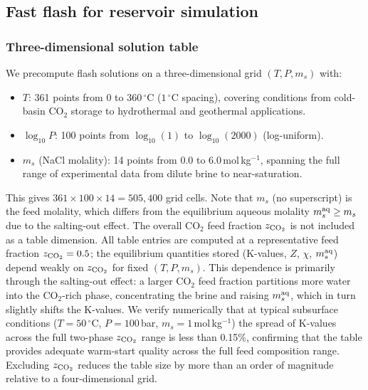 \documentclass[preprint,12pt,number]{elsarticle}
\begin{document}
\subsection{Fast flash for reservoir simulation}
\label{sec:fast_flash}

\subsubsection{Three-dimensional solution table}
\label{sec:table}

We precompute flash solutions on a three-dimensional grid $(T, P, m_s)$ with:
\begin{itemize}
  \item $T$: 361 points from 0 to $360\,^\circ$C ($1\,^\circ$C spacing),
        covering conditions from cold-basin CO$_2$ storage to hydrothermal and
        geothermal applications.
  \item $\log_{10}P$: 100 points from $\log_{10}(1)$ to $\log_{10}(2000)$ (log-uniform).
  \item $m_s$ (NaCl molality): 14 points from 0.0 to 6.0\,mol\,kg$^{-1}$, spanning
        the full range of experimental data from dilute brine to near-saturation.
\end{itemize}
This gives $361 \times 100 \times 14 = 505{,}400$ grid cells.
Note that $m_s$ (no superscript) is the feed molality, which differs from the
equilibrium aqueous molality $m_s^{\rm aq} \geq m_s$ due to the salting-out effect.
The overall CO$_2$ feed fraction $z_{\rm CO_2}$ is not included as a table dimension.
All table entries are computed at a representative feed fraction $z_{\rm CO_2} = 0.5$;
the equilibrium quantities stored (K-values, $Z$, $\chi$, $m_s^{\rm aq}$)
depend weakly on $z_{\rm CO_2}$ for fixed $(T, P, m_s)$.
This dependence is primarily through the salting-out effect: a larger CO$_2$
feed fraction partitions more water into the CO$_2$-rich phase, concentrating
the brine and raising $m_s^{\rm aq}$, which in turn slightly shifts the
K-values.
We verify numerically that at typical subsurface conditions ($T = 50\,^\circ$C,
$P = 100$\,bar, $m_s = 1$\,mol\,kg$^{-1}$) the spread of K-values across the
full two-phase $z_{\rm CO_2}$ range is less than 0.15\%, confirming that the table
provides adequate warm-start quality across the full feed composition range.
Excluding $z_{\rm CO_2}$ reduces the table size by more than an order of magnitude
relative to a four-dimensional grid.
\end{document}
